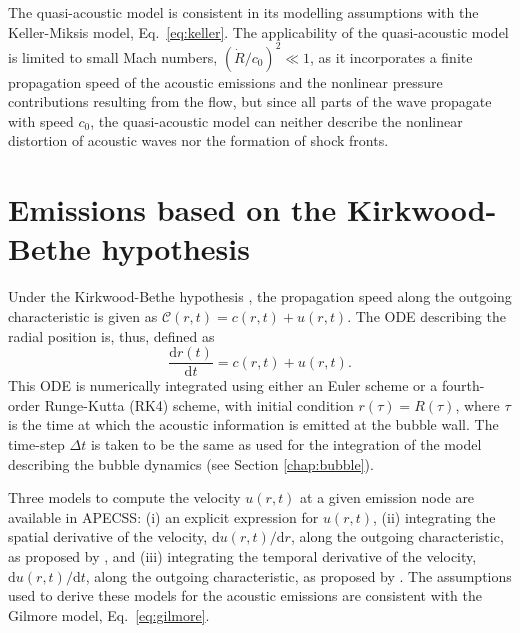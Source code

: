 The quasi-acoustic model is consistent in its modelling assumptions with the Keller-Miksis model, Eq.~\eqref{eq:keller}. The applicability of the quasi-acoustic model is limited to small Mach numbers, $(\dot{R}/c_0)^2 \ll 1$, as it incorporates a finite propagation speed of the acoustic emissions and the nonlinear pressure contributions resulting from the flow, but since all parts of the wave propagate with speed $c_0$, the quasi-acoustic model can neither describe the nonlinear distortion of acoustic waves nor the formation of shock fronts. 

\section{Emissions based on the Kirkwood-Bethe hypothesis}
\label{sec:emissionskb}

Under the Kirkwood-Bethe hypothesis \citep{Kirkwood1942,Cole1948}, the propagation speed along the outgoing characteristic is given as $\mathcal{C}(r,t) = c(r,t) + u(r,t)$. The ODE describing 
the radial position is, thus, defined as 
\begin{equation}
    \frac{\mathrm{d}r(t)}{\mathrm{d}t} = c(r,t) + u(r,t). \label{eq:drdt}
\end{equation}
This ODE is numerically integrated using either an Euler scheme or a fourth-order Runge-Kutta (RK4) scheme, with initial condition $r(\tau) = R(\tau)$, where  $\tau$ is the time at which the acoustic information is emitted at the bubble wall. The time-step $\Delta t$ is taken to be the same as used for the integration of the model describing the bubble dynamics (see Section \ref{chap:bubble}).

Three models to compute the velocity $u(r,t)$ at a given emission node are available in APECSS: (i) an explicit expression for $u(r,t)$, (ii) integrating the spatial derivative of the velocity, $\mathrm{d}u(r,t)/\mathrm{d}r$, along the outgoing characteristic, as proposed by \citet{Gilmore1952}, and (iii) integrating the temporal derivative of the velocity, $\mathrm{d}u(r,t)/\mathrm{d}t$, along the outgoing characteristic, as proposed by \citet{Hickling1963}.
The assumptions used to derive these models for the acoustic emissions are consistent with the Gilmore model, Eq.~\eqref{eq:gilmore}.

